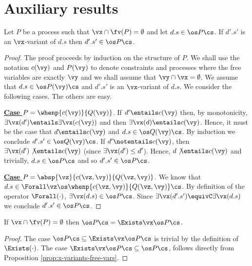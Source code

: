 \documentclass{tlp}
\begin{document}
\section{Auxiliary results} \label{app:proofs-aux}
\begin{proposition}\label{prop:x-variants-free-vars}
Let $P$ be a process such that   $\vx \cap \fv(P) = \emptyset$ and let $d.s \in \os P\cs$. If   $d'.s'$ is an $\vx$-variant of $d.s$ then $d'.s' \in \os P \cs$. 
\end{proposition}
\begin{proof}
	The proof proceeds  by induction on the structure of $P$. We shall use the notation $c(\vy)$ and $P(\vy)$ to denote constraints and processes where the free variables are exactly $\vy$ and we shall assume that $\vy \cap \vx = \emptyset$. We assume that $d.s \in \os P(\vy) \cs$ and $d'.s'$ is an $\vx$-variant of $d.s$. 
 We consider the following cases.  The others are easy. 

\noindent \underline{{\bf Case}  $P = \whenp{c(\vy)}{Q(\vy)}$}. If $d' \entails c(\vy)$ then, by monotonicity, $\exists \vx (d') \entails \exists \vx (c(\vy))$ and then $\exists \vx(d) \entails c(\vy)$. Hence, it must be the case that $d \entails c(\vy)$ and  $d.s \in \os Q(\vy)\cs$.  By induction we conclude $d'.s' \in \os Q(\vy)\cs$. If $d' \notentails c(\vy)$, then $\exists \vx(d') \not\entails c(\vy)$ (since $\exists \vx (d') \leq d'$). Hence, $d \not\entails c(\vy)$ and trivially, $d.s \in \os P\cs$ and so $d'.s' \in \os P\cs$. 

\noindent \underline{{\bf Case} $P = \absp{\vz}{c(\vz,\vy)}{Q(\vz,\vy)}$}. 
			We know that 
		$d.s \in \Forall \vz \os \whenp{c(\vz,\vy)}{Q(\vz,\vy)}\cs$. 
		By definition of the operator $\Forall(\cdot)$, $\exists \vx (d.s) \in \os P\cs $. Since   $\exists \vx (d'.s') \equivC \exists \vx (d.s)$ we conclude $d'.s' \in \os P\cs$. 
\end{proof}

\begin{proposition}\label{prop:exists-free-vars}
If $\vx \cap \fv(P) = \emptyset$ then $\os P\cs = \Exists \vx \os P\cs$.
\end{proposition}
\begin{proof}
		The case $\os P\cs \subseteq \Exists \vx \os P \cs$ is trivial by the definition of $\Exists(\cdot)$. 
		The case $ \Exists \vx \os P \cs\subseteq \os P\cs $, follows directly from Proposition \ref{prop:x-variants-free-vars}.
\end{proof}
\end{document}
